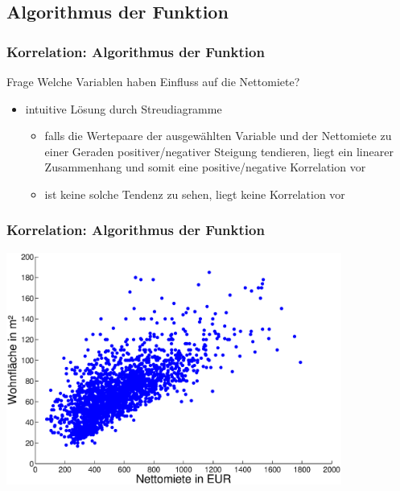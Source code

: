 \documentclass{beamer}
\begin{document}
\subsection{Algorithmus der Funktion}

\begin{frame}
	\frametitle{Korrelation: Algorithmus der Funktion}

	\begin{block}{Frage}
		Welche Variablen haben Einfluss auf die Nettomiete?
	\end{block}
	
	\begin{itemize}
		\item intuitive Lösung durch Streudiagramme
		\begin{itemize}
			\item falls die Wertepaare der ausgewählten Variable und der Nettomiete zu einer Geraden positiver/negativer Steigung tendieren, liegt ein linearer Zusammenhang und somit eine positive/negative Korrelation vor
			\item ist keine solche Tendenz zu sehen, liegt keine Korrelation vor
		\end{itemize}
	\end{itemize}
\end{frame}

\begin{frame}
	\frametitle{Korrelation: Algorithmus der Funktion}
	
	\begin{center}
    \includegraphics[width=11cm]{figures/streudiag-nm-wfl-alle}
  \end{center}
\end{frame}
\end{document}
